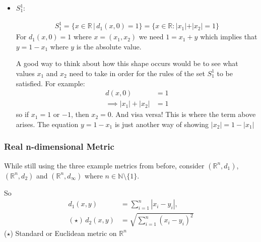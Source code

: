 \documentclass[10pt]{article}
\begin{document}
\begin{itemize}
    \item $S_{1}^{1}$:
    \begin{multicols}{2}

    \begin{align*}
        S_{1}^{1}=\{x\in\mathbb{R}\,|\,d_{1}(x,0)=1\}=\{x\in\mathbb{R}:|x_{1}|+|x_{2}|=1\}
    \end{align*}
    For $d_{1}(x,0)=1$ where $x=(x_{1}, x_{2})$ we need $1=x_{1}+y$ which implies that $y=1-x_{1}$ where $y$ is the absolute value.

    A good way to think about how this shape occurs would be to see what values $x_{1}$ and $x_{2}$ need to take in order for the rules of the set $S_{1}^{1}$ to be satisfied.
    For example:
    \begin{align*}
        d(x,0)&=1\\
        \implies|x_{1}|+|x_{2}|&=1 
    \end{align*}
    so if $x_{1}=1$ or $-1$, then $x_{2}=0$. And visa versa! This is where the term above arises. The equation $y=1-x_{1}$ is just another way of showing $|x_{2}|=1-|x_{1 }|$
    \end{multicols}
\end{itemize}
\newpage

\subsubsection{Real n-dimensional Metric}
While still using the three example metrics from before, consider $(\mathbb{R}^{n}, d_{1})$, $(\mathbb{R}^{n}, d_{2})$ and $(\mathbb{R}^{n}, d_{\infty})$ where $n\in\mathbb{N}\setminus\{1\}$.

So
\begin{align*}
    d_{1}(x,y)&=\sum^{n}_{i=1}|x_{i}-y_{i}|,\\
    (\star)\,d_{2}(x,y)&=\sqrt{\sum^{n}_{i=1}(x_{i}-y_{i})^{2}}
\end{align*}
($\star$) Standard or Euclidean metric on $\mathbb{R}^{n}$
\end{document}
